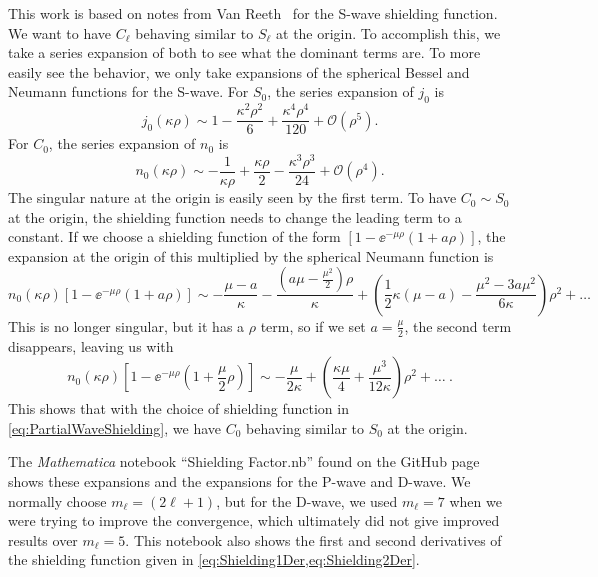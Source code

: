 \documentclass[Dissertation.tex]{subfiles}
\begin{document}
This work is based on notes from Van Reeth \cite{VanReethPrivate}\
for the S-wave shielding function.
We want to have $C_\ell$ behaving similar to $S_\ell$ at the origin. To
accomplish this, we take a series expansion of both to see what the dominant
terms are. To more easily see the behavior, we only take expansions of the
spherical Bessel and Neumann functions for the S-wave. For $S_0$, the series expansion of
$j_0$ is
\begin{equation}
j_0(\kappa\rho) \sim 1 - \frac{\kappa^2 \rho^2}{6} + \frac{\kappa^4 \rho^4}{120} + \mathcal{O}(\rho^5).
\end{equation}
For $C_0$, the series expansion of $n_0$ is
\begin{equation}
n_0(\kappa\rho) \sim -\frac{1}{\kappa\rho} + \frac{\kappa \rho}{2} - \frac{\kappa^3 \rho^3}{24} + \mathcal{O}(\rho^4).
\end{equation}
The singular nature at the origin is easily seen by the first term. To have
$C_0 \sim S_0$ at the origin, the shielding function needs to change the
leading term to a constant. If we choose a shielding function of the form
$\left[1 - \ee^{-\mu \rho} \left(1+a \rho\right)\right]$, the
expansion at the origin of this multiplied by the spherical Neumann function is
\begin{equation}
n_0(\kappa\rho) \left[1 - \ee^{-\mu \rho} \left(1+a \rho\right)\right] \sim
-\frac{\mu-a}{\kappa} - \frac{\left(a\mu - \frac{\mu^2}{2}\right)\rho}{\kappa}
+ \left(\frac{1}{2}\kappa(\mu-a) - \frac{\mu^2 - 3 a \mu^2}{6\kappa}\right) \rho^2 + \ldots
\end{equation}
This is no longer singular, but it has a $\rho$ term, so if we set
$a = \frac{\mu}{2}$, the second term disappears, leaving us with
\begin{equation}
n_0(\kappa\rho) \left[1 - \ee^{-\mu \rho} \left(1+\frac{\mu}{2}\rho\right)\right] \sim
-\frac{\mu}{2\kappa} + \left(\frac{\kappa\mu}{4} + \frac{\mu^3}{12\kappa}\right) \rho^2 + \ldots \ .
\end{equation}
This shows that with the choice of shielding function in \cref{eq:PartialWaveShielding},
we have $C_0$ behaving similar to $S_0$ at the origin.

The \emph{Mathematica} notebook ``Shielding Factor.nb'' found on the GitHub
page \cite{GitHub} shows these expansions and the expansions for the P-wave
and D-wave. We normally choose $m_\ell = (2\ell+1)$, but for the D-wave, we
used $m_\ell = 7$ when we were trying to improve the convergence, which
ultimately did not give improved results over $m_\ell = 5$. This notebook
also shows the first and second derivatives of the shielding function given
in \cref{eq:Shielding1Der,eq:Shielding2Der}.
\end{document}
